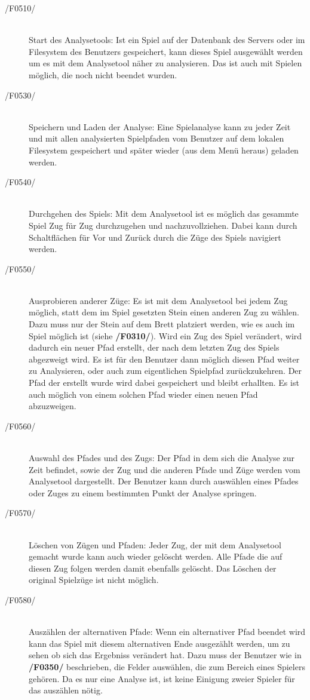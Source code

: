 \begin{description}
	\item[/F0510/]~\\
		Start des Analysetools: Ist ein Spiel auf der Datenbank des Servers oder im Filesystem des Benutzers gespeichert, kann dieses Spiel ausgewählt werden um es mit dem Analysetool näher zu analysieren. Das ist auch mit Spielen möglich, die noch nicht beendet wurden.
	\item[/F0530/]~\\
		Speichern und Laden der Analyse: Eine Spielanalyse kann zu jeder Zeit und mit allen analysierten Spielpfaden vom Benutzer auf dem lokalen Filesystem gespeichert und später wieder (aus dem Menü heraus) geladen werden.
	\item[/F0540/]~\\
		Durchgehen des Spiels: Mit dem Analysetool ist es möglich das gesammte Spiel Zug für Zug durchzugehen und nachzuvollziehen. Dabei kann durch Schaltflächen für Vor und Zurück durch die Züge des Spiels navigiert werden.
	\item[/F0550/]~\\
		Ausprobieren anderer Züge: Es ist mit dem Analysetool bei jedem Zug möglich, statt dem im Spiel gesetzten Stein einen anderen Zug zu wählen. Dazu muss nur der Stein auf dem Brett platziert werden, wie es auch im Spiel möglich ist (siehe \textbf{/F0310/}). Wird ein Zug des Spiel verändert, wird dadurch ein neuer Pfad erstellt, der nach dem letzten Zug des Spiels abgezweigt wird. Es ist für den Benutzer dann möglich diesen Pfad weiter zu Analysieren, oder auch zum eigentlichen Spielpfad zurückzukehren. Der Pfad der erstellt wurde wird dabei gespeichert und bleibt erhallten. Es ist auch möglich von einem solchen Pfad wieder einen neuen Pfad abzuzweigen.
	\item[/F0560/]~\\
		Auswahl des Pfades und des Zugs: Der Pfad in dem sich die Analyse zur Zeit befindet, sowie der Zug und die anderen Pfade und Züge werden vom Analysetool dargestellt. Der Benutzer kann durch auswählen eines Pfades oder Zuges zu einem bestimmten Punkt der Analyse springen.
	\item[/F0570/]~\\
		Löschen von Zügen und Pfaden: Jeder Zug, der mit dem Analysetool gemacht wurde kann auch wieder gelöscht werden. Alle Pfade die auf diesen Zug folgen werden damit ebenfalls gelöscht. Das Löschen der original Spielzüge ist nicht möglich.
	\item[/F0580/]~\\
		Auszählen der alternativen Pfade: Wenn ein alternativer Pfad beendet wird kann das Spiel mit diesem alternativen Ende ausgezählt werden, um zu sehen ob sich das Ergebniss verändert hat. Dazu muss der Benutzer wie in \textbf{/F0350/} beschrieben, die Felder auswählen, die zum Bereich eines Spielers gehören. Da es nur eine Analyse ist, ist keine Einigung zweier Spieler für das auszählen nötig.
\end{description}


